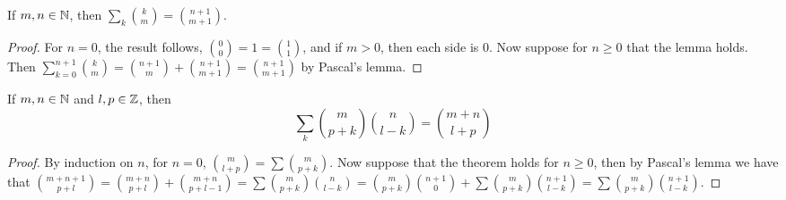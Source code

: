 \begin{lemma}\label{2.0.4}
    If $m,n \in \mathbb{N}$, then  $\sum_{k}{\binom{k}{m}}=\binom{n+1}{m+1}$.
\end{lemma}
\begin{proof}
    For $n=0$, the result follows,  $\binom{0}{0}=1=\binom{1}{1}$, and if $m>0$, then each side is
    $0$. Now suppose for $n \geq 0$ that the lemma holds. Then
    $\sum_{k=0}^{n+1}{\binom{k}{m}}=\binom{n+1}{m}+\binom{n+1}{m+1}=\binom{n+1}{m+1}$ by Pascal's
    lemma.
\end{proof}

\begin{theorem}\label{2.0.5}
    If $m,n \in \mathbb{N}$ and  $l,p \in \mathbb{Z}$, then
        \begin{equation}
            \sum_{k}{\binom{m}{p+k}\binom{n}{l-k}}=\binom{m+n}{l+p}
        \end{equation} 
\end{theorem}
\begin{proof}
    By induction on $n$, for  $n=0$,  $\binom{m}{l+p}=\sum{\binom{m}{p+k}}$. Now suppose that the
    theorem holds for $n \geq 0$, then by Pascal's lemma we have that
    $\binom{m+n+1}{p+l}=\binom{m+n}{p+l}+\binom{m+n}{p+l-1}=\sum{\binom{m}{p+k}\binom{n}{l-k}}=
    \binom{m}{p+k}\binom{n+1}{0}+\sum{\binom{m}{p+k}\binom{n+1}{l-k}}=\sum{\binom{m}{p+k}\binom{n+1}{l-k}}$.
\end{proof}
